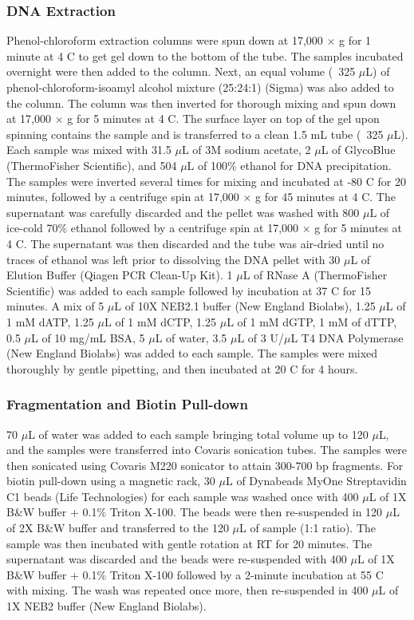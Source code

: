 \subsubsection{DNA Extraction}

Phenol-chloroform extraction columns were spun down at 17,000 $\times$ g for 1 minute at 4 \textdegree C to get gel down to the bottom of the tube.
The samples incubated overnight were then added to the column.
Next, an equal volume (~325 $\mu$L) of phenol-chloroform-isoamyl alcohol mixture (25:24:1) (Sigma) was also added to the column.
The column was then inverted for thorough mixing and spun down at 17,000 $\times$ g for 5 minutes at 4 \textdegree C.
The surface layer on top of the gel upon spinning contains the sample and is transferred to a clean 1.5 mL tube (~325 $\mu$L).
Each sample was mixed with 31.5 $\mu$L of 3M sodium acetate, 2 $\mu$L of GlycoBlue (ThermoFisher Scientific), and 504 $\mu$L of 100\% ethanol for DNA precipitation.
The samples were inverted several times for mixing and incubated at -80 \textdegree C for 20 minutes, followed by a centrifuge spin at 17,000 $\times$ g for 45 minutes at 4 \textdegree C.
The supernatant was carefully discarded and the pellet was washed with 800 $\mu$L of ice-cold 70\% ethanol followed by a centrifuge spin at 17,000 $\times$ g for 5 minutes at 4 \textdegree C.
The supernatant was then discarded and the tube was air-dried until no traces of ethanol was left prior to dissolving the DNA pellet with 30 $\mu$L of Elution Buffer (Qiagen PCR Clean-Up Kit).
1 $\mu$L of RNase A (ThermoFisher Scientific) was added to each sample followed by incubation at 37 \textdegree C for 15 minutes.
A mix of 5 $\mu$L of 10X NEB2.1 buffer (New England Biolabs), 1.25 $\mu$L of 1 mM dATP, 1.25 $\mu$L of 1 mM dCTP, 1.25 $\mu$L of 1 mM dGTP, 1 mM of dTTP, 0.5 $\mu$L of 10 mg/mL BSA, 5 $\mu$L of water, 3.5 $\mu$L of 3 U/$\mu$L T4 DNA Polymerase (New England Biolabs) was added to each sample.
The samples were mixed thoroughly by gentle pipetting, and then incubated at 20 \textdegree C for 4 hours.

\subsubsection{Fragmentation and Biotin Pull-down}

70 $\mu$L of water was added to each sample bringing total volume up to 120 $\mu$L, and the samples were transferred into Covaris sonication tubes.
The samples were then sonicated using Covaris M220 sonicator to attain 300-700 bp fragments.
For biotin pull-down using a magnetic rack, 30 $\mu$L of Dynabeads MyOne Streptavidin C1 beads (Life Technologies) for each sample was washed once with 400 $\mu$L of 1X B\&W buffer + 0.1\% Triton X-100.
The beads were then re-suspended in 120 $\mu$L of 2X B\&W buffer and transferred to the 120 $\mu$L of sample (1:1 ratio).
The sample was then incubated with gentle rotation at RT for 20 minutes.
The supernatant was discarded and the beads were re-suspended with 400 $\mu$L of 1X B\&W buffer + 0.1\% Triton X-100 followed by a 2-minute incubation at 55 \textdegree C with mixing.
The wash was repeated once more, then re-suspended in 400 $\mu$L of 1X NEB2 buffer (New England Biolabs).

